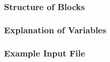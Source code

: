 \vspace{5mm}
\subsubsection{Structure of Blocks}
\vspace{5mm}



\vspace{5mm}

\vspace{5mm}
\subsubsection{Explanation of Variables}
\begin{description}

\end{description}

\subsubsection{Example Input File}


